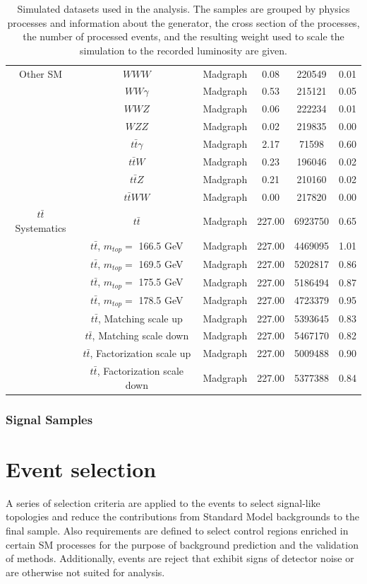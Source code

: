 \begin{table}
\begin{center}
\begin{tabular}{c|c|c|c|c|c}
\hline 
Other SM & $WWW$ & Madgraph & 0.08 & 220549 & 0.01 \\
 & $WW\gamma$ & Madgraph & 0.53 & 215121 & 0.05 \\
 & $WWZ$ & Madgraph & 0.06 & 222234 & 0.01 \\
 & $WZZ$ & Madgraph & 0.02 & 219835 & 0.00 \\
 & $t\bar{t}\gamma$ & Madgraph & 2.17 & 71598 & 0.60 \\
 & $t\bar{t}W$ & Madgraph & 0.23 & 196046 & 0.02 \\
 & $t\bar{t}Z$ & Madgraph & 0.21 & 210160 & 0.02 \\
 & $t\bar{t}WW$ & Madgraph & 0.00 & 217820 & 0.00 \\
\hline 
$t\bar{t}$ Systematics & $t\bar{t}$ & Madgraph & 227.00 & 6923750 & 0.65 \\
 & $t\bar{t}$, $m_{top} =$ 166.5 GeV & Madgraph & 227.00 & 4469095 & 1.01 \\
 & $t\bar{t}$, $m_{top} =$ 169.5 GeV & Madgraph & 227.00 & 5202817 & 0.86 \\
 & $t\bar{t}$, $m_{top} =$ 175.5 GeV & Madgraph & 227.00 & 5186494 & 0.87 \\
 & $t\bar{t}$, $m_{top} =$ 178.5 GeV & Madgraph & 227.00 & 4723379 & 0.95 \\
 & $t\bar{t}$, Matching scale up & Madgraph & 227.00 & 5393645 & 0.83 \\
 & $t\bar{t}$, Matching scale down & Madgraph & 227.00 & 5467170 & 0.82 \\
 & $t\bar{t}$, Factorization scale up & Madgraph & 227.00 & 5009488 & 0.90 \\
 & $t\bar{t}$, Factorization scale down & Madgraph & 227.00 & 5377388 & 0.84 \\

\end{tabular}
\caption{Simulated datasets used in the analysis. The samples are grouped by physics processes and information about the generator, the cross section of the processes, the number of processed events, and the resulting weight used to scale the simulation to the recorded luminosity are given.}
\label{tab:MCSamples}
\end{center}
\end{table}

\subsubsection{Signal Samples}

\section{Event selection}
A series of selection criteria are applied to the events to select signal-like topologies and reduce the contributions from Standard Model backgrounds to the final sample. Also requirements are defined to select control regions enriched in certain SM processes for the purpose of background prediction and the validation of methods. Additionally, events are reject that exhibit signs of detector noise or are otherwise not suited for analysis. 
